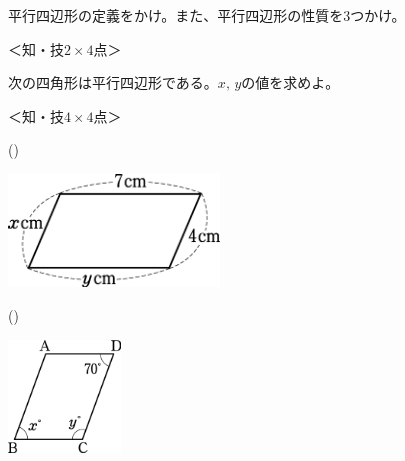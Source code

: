 \documentclass[
  12pt,a4paper,lualatex,ja=standard]{bxjsarticle}
\begin{document}
\begin{flushleft}

\noindent{} \hspace{1pt}平行四辺形の定義をかけ。また、平行四辺形の性質を3つかけ。

%
\begin{flushright}%
\footnotesize{＜知・技$2\times 4$点＞}%
\end{flushright}%


\vfill

\noindent{} \hspace{1pt}次の四角形は平行四辺形である。$x, \, y$の値を求めよ。

%
\begin{flushright}%
\footnotesize{＜知・技$4\times 4$点＞}%
\end{flushright}%


\begin{multicols}{2}
()\hspace{2.5pt}

\begin{center}
\def\@captype{figure}
\includegraphics[height=30mm]{img/img1.jpg}

\end{center}

\columnbreak

()\hspace{2.5pt}

\begin{center}
\def\@captype{figure}
\includegraphics[height=30mm]{img/img2.jpg}

\end{center}


\end{multicols}
\end{flushleft}
\end{document}
